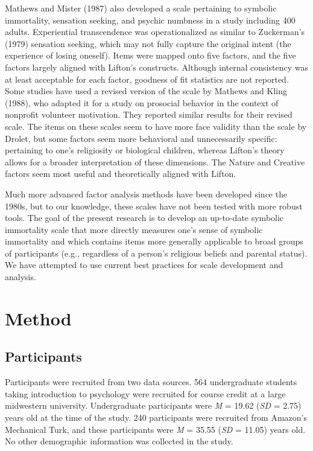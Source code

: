 \documentclass[
  english,
  man]{apa6}
\begin{document}
Mathews and Mister (1987) also developed a scale pertaining to
symbolic immortality, sensation seeking, and psychic numbness in a study
including 400 adults. Experiential transcendence was operationalized as
similar to Zuckerman's (1979) sensation seeking, which may
not fully capture the original intent (the experience of losing
oneself). Items were mapped onto five factors, and the five factors
largely aligned with Lifton's constructs. Although internal consistency
was at least acceptable for each factor, goodness of fit statistics are
not reported. Some studies have used a revised version of the scale by
Mathews and Kling (1988), who adapted it for a study on
prosocial behavior in the context of nonprofit volunteer motivation.
They reported similar results for their revised scale. The items on
these scales seem to have more face validity than the scale by Drolet,
but some factors seem more behavioral and unnecessarily specific:
pertaining to one's religiosity or biological children, whereas Lifton's
theory allows for a broader interpretation of these dimensions. The
Nature and Creative factors seem most useful and theoretically aligned
with Lifton.

Much more advanced factor analysis methods have been developed since the
1980s, but to our knowledge, these scales have not been tested with more
robust tools. The goal of the present research is to develop an
up-to-date symbolic immortality scale that more directly measures one's
sense of symbolic immortality and which contains items more generally
applicable to broad groups of participants (e.g., regardless of a
person's religious beliefs and parental status). We have attempted to
use current best practices for scale development and analysis.

\section{Method}\label{method}

\subsection{Participants}\label{participants}

Participants were recruited from two data sources. 564
undergraduate students taking introduction to psychology were recruited
for course credit at a large midwestern university. Undergraduate
participants were \emph{M} = 19.62 (\emph{SD} =
2.75) years old at the time of the
study. 240 participants were recruited from Amazon's
Mechanical Turk, and these participants were \emph{M} =
35.55 (\emph{SD} =
11.05) years old. No other demographic
information was collected in the study.
\end{document}
